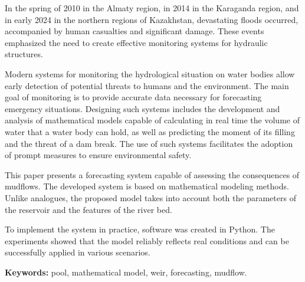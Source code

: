 In the spring of 2010 in the Almaty region, in 2014 in the Karaganda
region, and in early 2024 in the northern regions of Kazakhstan,
devastating floods occurred, accompanied by human casualties and
significant damage. These events emphasized the need to create effective
monitoring systems for hydraulic structures.

Modern systems for monitoring the hydrological situation on water bodies
allow early detection of potential threats to humans and the
environment. The main goal of monitoring is to provide accurate data
necessary for forecasting emergency situations. Designing such systems
includes the development and analysis of mathematical models capable of
calculating in real time the volume of water that a water body can hold,
as well as predicting the moment of its filling and the threat of a dam
break. The use of such systems facilitates the adoption of prompt
measures to ensure environmental safety.

This paper presents a forecasting system capable of assessing the
consequences of mudflows. The developed system is based on mathematical
modeling methods. Unlike analogues, the proposed model takes into
account both the parameters of the reservoir and the features of the
river bed.

To implement the system in practice, software was created in Python. The
experiments showed that the model reliably reflects real conditions and
can be successfully applied in various scenarios.

{\bfseries Keywords:} pool, mathematical model, weir, forecasting, mudflow.


